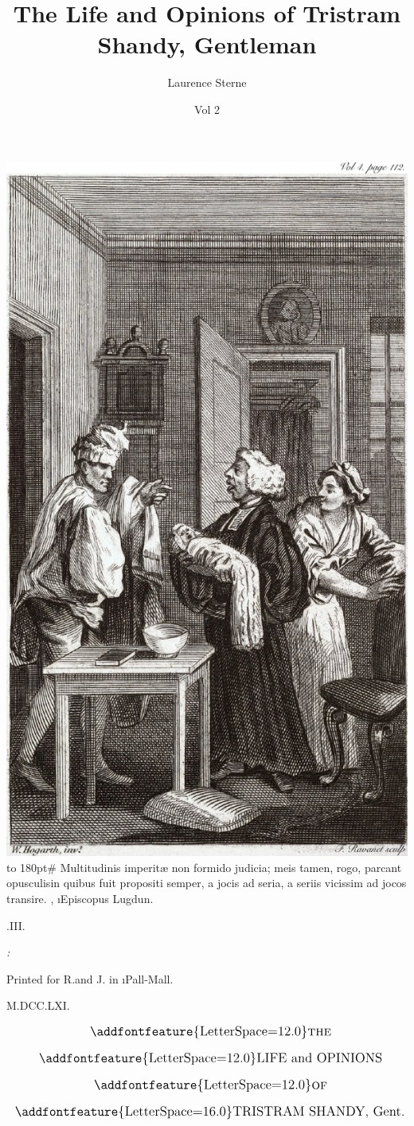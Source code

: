 \documentclass[twoside]{article}
\title{The Life and Opinions of Tristram Shandy, Gentleman}
\author{Laurence Sterne}
\date{Vol 2}
\begin{document}
\pagestyle{empty}
\null\newpage
\noindent\includegraphics[width=\textwidth]{hogarth-front-3.pdf}
\newpage
\vbox{\openup 10pt}
\vfill
\vbox{\openup -3pt\halign to 180pt{\footnotesize #\cr
Multitudinis imperitæ non formido judicia; meis\cr
\quad tamen, rogo, parcant opusculis\tsh in quibus\cr
\quad fuit propositi semper, a jocis ad seria, a seriis\cr
\quad vicissim ad jocos transire.\hfill\cr
\hfill {},\cr
\hfill \i{Episcopus Lugdun.}\cr}}
\vfill
\centerline{.\quad III.}
\vfill
\centerline{\itshape{}:}
\centerline{\smaller Printed for R.\@ and J.\@ {} in \i{Pall-Mall}.}
\centerline{M.DCC.LXI.}
\newpage
\null
\newpage
\pagestyle{fancy}
\thispagestyle{empty}
\[\vbox{\openup 12pt\halign to \textwidth{\hss\large # \hss\cr
\addfontfeature{LetterSpace=12.0}\textsc{the}\cr
\addfontfeature{LetterSpace=12.0}LIFE and OPINIONS\cr
\addfontfeature{LetterSpace=12.0}\textsc{of}\cr
{\addfontfeature{LetterSpace=16.0}TRISTRAM SHANDY}, Gent.\cr}}\]
\end{document}
